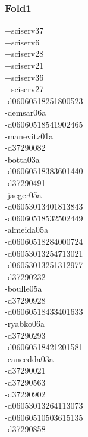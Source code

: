 \begin{multicols}{3}
\subsubsection*{Fold1}
+sciserv37\\
+sciserv6\\
+sciserv28\\
+sciserv21\\
+sciserv36\\
+sciserv27\\
-d06060518251800523\\
-demsar06a\\
-d06060518541902465\\
-manevitz01a\\
-d37290082\\
-botta03a\\
-d06060518383601440\\
-d37290491\\
-jaeger05a\\
-d06053013401813843\\
-d06060518532502449\\
-almeida05a\\
-d06060518284000724\\
-d06053013254713021\\
-d06053013251312977\\
-d37290232\\
-boulle05a\\
-d37290928\\
-d06060518433401633\\
-ryabko06a\\
-d37290293\\
-d06060518421201581\\
-cancedda03a\\
-d37290021\\
-d37290563\\
-d37290902\\
-d06053013264113073\\
-d06060510503615135\\
-d37290858\\

\end{multicols}
